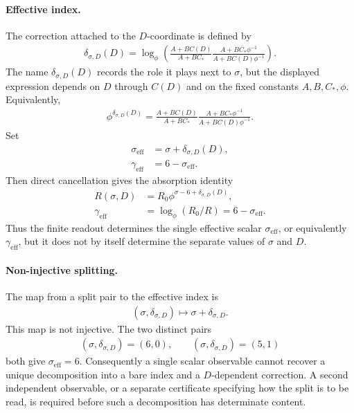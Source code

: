 \paragraph{Effective index.}
The correction attached to the $D$-coordinate is defined by
$$
\begin{aligned}
\delta_{\sigma,D}(D)=\log_\phi\left(\frac{A+B C(D)}{A+B C_\ast}\frac{A+B C_\ast\phi^{-1}}{A+B C(D)\phi^{-1}}\right).
\end{aligned}
$$
The name $\delta_{\sigma,D}(D)$ records the role it plays next to $\sigma$, but the displayed expression depends on $D$ through $C(D)$ and on the fixed constants $A,B,C_\ast,\phi$. Equivalently,
$$
\begin{aligned}
\phi^{\delta_{\sigma,D}(D)}=\frac{A+B C(D)}{A+B C_\ast}\frac{A+B C_\ast\phi^{-1}}{A+B C(D)\phi^{-1}}.
\end{aligned}
$$
Set
$$
\begin{aligned}
\sigma_{\mathrm{eff}}&=\sigma+\delta_{\sigma,D}(D),\\
\gamma_{\mathrm{eff}}&=6-\sigma_{\mathrm{eff}}.
\end{aligned}
$$
Then direct cancellation gives the absorption identity
$$
\begin{aligned}
R(\sigma,D)&=R_0\phi^{\sigma-6+\delta_{\sigma,D}(D)},\\
\gamma_{\mathrm{eff}}&=\log_\phi(R_0/R)=6-\sigma_{\mathrm{eff}}.
\end{aligned}
$$
Thus the finite readout determines the single effective scalar $\sigma_{\mathrm{eff}}$, or equivalently $\gamma_{\mathrm{eff}}$, but it does not by itself determine the separate values of $\sigma$ and $D$.

\paragraph{Non-injective splitting.}
The map from a split pair to the effective index is
$$
\begin{aligned}
(\sigma,\delta_{\sigma,D})\longmapsto \sigma+\delta_{\sigma,D}.
\end{aligned}
$$
This map is not injective. The two distinct pairs
$$
\begin{aligned}
(\sigma,\delta_{\sigma,D})=(6,0),\qquad (\sigma,\delta_{\sigma,D})=(5,1)
\end{aligned}
$$
both give $\sigma_{\mathrm{eff}}=6$. Consequently a single scalar observable cannot recover a unique decomposition into a bare index and a $D$-dependent correction. A second independent observable, or a separate certificate specifying how the split is to be read, is required before such a decomposition has determinate content.

